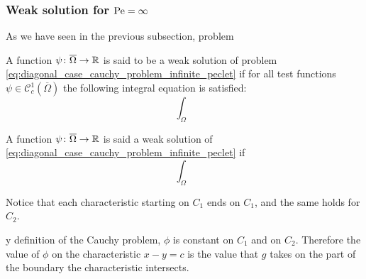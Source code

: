 \subsubsection{Weak solution for \texorpdfstring{$\mathrm{Pe} =
\infty$}{infinite Péclet's number}}


As we have seen in the previous subsection, problem 

\begin{definition}
	A function $\psi \colon \overline{\Omega} \rightarrow \mathbb{R}$ is said to be a
	weak solution of problem
	\eqref{eq:diagonal_case_cauchy_problem_infinite_peclet} if for all test
	functions $\psi \in \mathcal{C}^1_c (\overline{\Omega})$ the following
	integral equation is satisfied:
	\begin{equation}
		\int_\Omega 
	\end{equation}
	
	A function $\psi \colon \overline{\Omega} \rightarrow \mathbb{R}$
	is said a weak solution of
	\eqref{eq:diagonal_case_cauchy_problem_infinite_peclet} if 
	\[
		\int_\Omega 
	\]
\end{definition}


Notice that each characteristic starting on $C_1$ ends on $C_1$, and the same
holds for $C_2$. 

y definition of the Cauchy problem, $\phi$ is
constant on $C_1$ and on $C_2$. Therefore the value of $\phi$ on the
characteristic $x - y = c$ is the value that $g$ takes on the part of the
boundary the characteristic intersects.